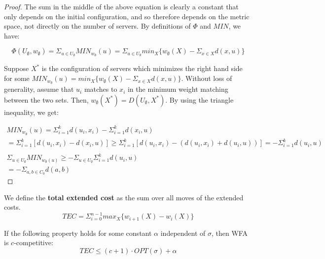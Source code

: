 \begin{proof}
    The sum in the middle of the above equation is clearly a constant that only depends on the initial configuration, and so therefore depends on the metric space, not directly on the number of servers. By definitions of $\Phi$ and $MIN$, we have:

    \begin{equation*}
        \Phi(U_\emptyset, w_\emptyset) = \Sigma_{u \in U_\emptyset} MIN_{w_\emptyset}(u) = \Sigma_{u \in U_\emptyset} min_X \{ w_\emptyset(X) - \Sigma_{x \in X} d(x, u)\}
    \end{equation*}

    Suppose $X^*$ is the configuration of servers which minimizes the right hand side for some $MIN_{w_\emptyset}(u) = min_X \{ w_\emptyset(X) - \Sigma_{x \in X} d(x, u)\}$. Without loss of generality, assume that $u_i$ matches to $x_i$ in the minimum weight matching between the two sets. Then, $w_\emptyset(X^*) = D(U_\emptyset, X^*)$. By using the triangle inequality, we get:

    \begin{equation*}
        \begin{gathered}
            MIN_{w_\emptyset}(u) = \Sigma_{i=1}^k d(u_i, x_i) - \Sigma_{i=1}^k d(x_i , u) \\
            = \Sigma_{i=1}^k [d(u_i, x_i) - d(x_i, u)] \geq \Sigma_{i=1}^k [d(u_i, x_i) - (d(u_i, x_i) + d(u_i, u))] = - \Sigma_{i=1}^k d(u_i, u) \\ \\
            \Sigma_{u \in U_\emptyset} MIN_{w_\emptyset(u)} \geq -\Sigma_{u \in U_\emptyset} \Sigma_{i=1}^k d(u_i, u) \\
            = - \Sigma_{a, b \in C_0} d(a, b)
        \end{gathered}
    \end{equation*}
\end{proof}

\begin{definition}
    We define the \textbf{total extended cost} as the sum over all moves of the extended costs.
    \begin{equation*}
        TEC = \Sigma_{i = 0}^{n-1} max_X \{ w_{i+1} (X) - w_i(X)\}
    \end{equation*}
\end{definition}

\begin{lemma}
    If the following property holds for some constant $\alpha$ independent of $\sigma$, then WFA is $c$-competitive:
    \begin{equation*}
        TEC \leq (c+1) \cdot  OPT(\sigma) + \alpha
    \end{equation*}
\end{lemma}

